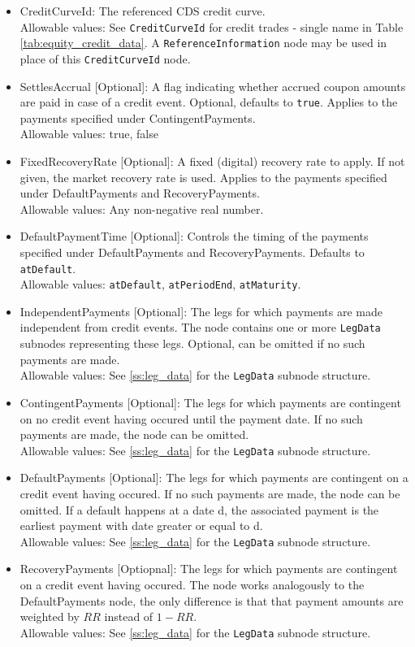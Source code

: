 \begin{itemize}
\item CreditCurveId: The referenced CDS credit curve. \\
  Allowable values: See \lstinline!CreditCurveId! for credit trades - single name in Table
  \ref{tab:equity_credit_data}. A \lstinline!ReferenceInformation! node may be used in place of this
  \lstinline!CreditCurveId! node.
\item SettlesAccrual [Optional]: A flag indicating whether accrued coupon amounts are paid in case of a credit
  event. Optional, defaults to \verb+true+. Applies to the payments specified under ContingentPayments.\\
  Allowable values: true, false
\item FixedRecoveryRate [Optional]: A fixed (digital) recovery rate to apply. If not given, the market recovery rate
  is used. Applies to the payments specified under DefaultPayments and RecoveryPayments.\\
  Allowable values: Any non-negative real number.
\item DefaultPaymentTime [Optional]: Controls the timing of the payments specified under DefaultPayments and
  RecoveryPayments. Defaults to \lstinline!atDefault!. \\
  Allowable values: \lstinline!atDefault!, \lstinline!atPeriodEnd!, \lstinline!atMaturity!.
\item IndependentPayments [Optional]: The legs for which payments are made independent from credit events. The node contains one or
  more \lstinline!LegData! subnodes representing these legs. Optional, can be omitted if no such payments are made. \\
  Allowable values: See \ref{ss:leg_data} for the \lstinline!LegData! subnode structure.
\item ContingentPayments [Optional]: The legs for which payments are contingent on no credit event having occured until
  the payment date. If no such payments are made, the node can be omitted. \\
  Allowable values: See \ref{ss:leg_data} for the \lstinline!LegData! subnode structure.
\item DefaultPayments [Optional]: The legs for which payments are contingent on a credit event having occured. If no
  such payments are made, the node can be omitted. If a default happens at a date d, the associated payment is the
  earliest payment with date greater or equal to d. \\
  Allowable values: See \ref{ss:leg_data} for the \lstinline!LegData! subnode structure.
\item RecoveryPayments [Optiopnal]: The legs for which payments are contingent on a credit event having occured. The
  node works analogously to the DefaultPayments node, the only difference is that that payment amounts are weighted by
  $RR$ instead of $1-RR$. \\
  Allowable values: See \ref{ss:leg_data} for the \lstinline!LegData! subnode structure.
\end{itemize}

